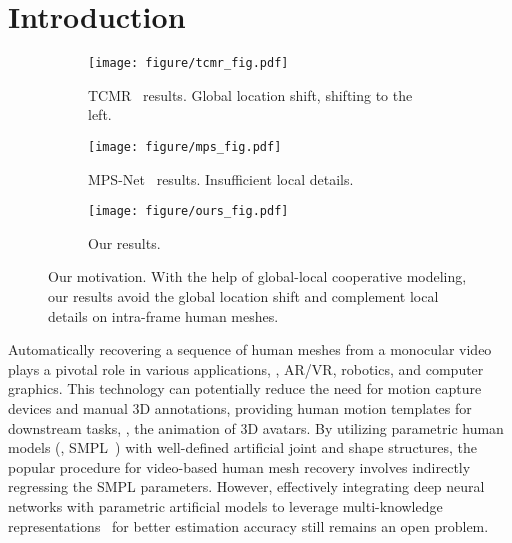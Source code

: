 \documentclass[10pt,twocolumn,letterpaper]{article}
\begin{document}
\section{Introduction}
	\label{sec:intro}
\begin{figure}[!t]
		\centering
		\begin{subfigure}{1\linewidth}
			\centering
			\texttt{[image: figure/tcmr\_fig.pdf]}
			\vspace{-0.7 em}
			\caption{TCMR~\cite{TCMR} results. Global location shift, shifting to the left.}
			
			\label{fig:tcmr-vis}
		\end{subfigure}
		\vfill
		\begin{subfigure}{1\linewidth}
			\texttt{[image: figure/mps\_fig.pdf]}
			\vspace{-0.7 em}
			\centering
			\caption{MPS-Net~\cite{MPS-net} results. Insufficient local details.}
			\label{fig:mps-vis}
		\end{subfigure}
		\vfill
		\begin{subfigure}{1\linewidth}
			\texttt{[image: figure/ours\_fig.pdf]}
			\vspace{-0.7 em}
			\centering
			\caption{Our results.}
			\label{fig:our-vis}
		\end{subfigure}
		\vspace{-1.7 em}
		\caption{Our motivation. With the help of global-local cooperative modeling, our results avoid the global location shift and complement local details on intra-frame human meshes.}
		\vspace{-1.8 em}
		\label{fig:motivation}
	\end{figure}
	



        Automatically recovering a sequence of human meshes from a monocular video plays a pivotal role in various applications, \eg, AR/VR, robotics, and computer graphics. This technology can potentially reduce the need for motion capture devices and manual 3D annotations, providing human motion templates for downstream tasks, \eg, the animation of 3D avatars. By utilizing parametric human models (\ie, SMPL~\cite{SMPL}) with well-defined artificial joint and shape structures, the popular procedure for video-based human mesh recovery involves indirectly regressing the SMPL parameters. 
        However, effectively integrating deep neural networks with parametric artificial models to leverage multi-knowledge representations~\cite{yang2021multiple} for better estimation accuracy still remains an open problem.
\end{document}
